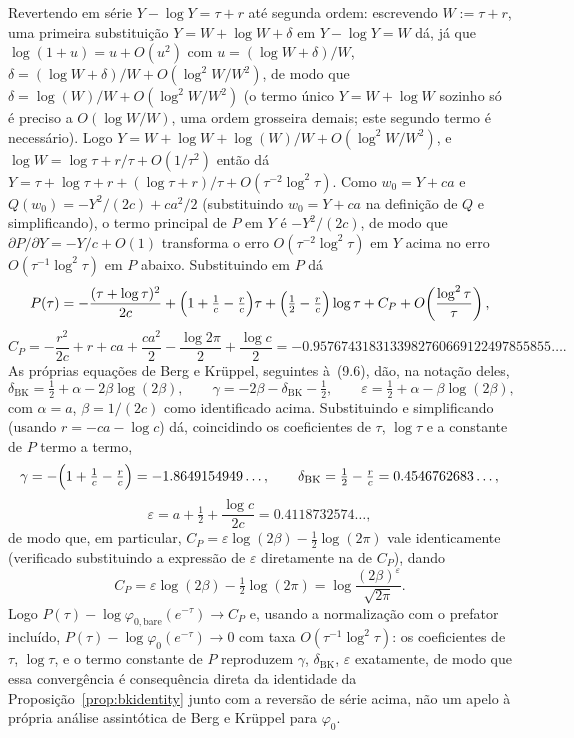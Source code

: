 \documentclass[11pt]{amsart}
\theoremstyle{plain}
\theoremstyle{definition}
\theoremstyle{remark}
\begin{document}
Revertendo em série $Y-\log Y=\tau+r$ até segunda ordem: escrevendo $W:=\tau+r$, uma primeira
substituição $Y=W+\log W+\delta$ em $Y-\log Y=W$ dá, já que $\log(1+u)=u+O(u^2)$ com
$u=(\log W+\delta)/W$, $\delta = (\log W+\delta)/W + O(\log^2W/W^2)$, de modo que
$\delta=\log(W)/W+O(\log^2W/W^2)$ (o termo único $Y=W+\log W$ sozinho só é preciso a
$O(\log W/W)$, uma ordem grosseira demais; este segundo termo é necessário). Logo
$Y=W+\log W+\log(W)/W+O(\log^2W/W^2)$, e $\log W=\log\tau+r/\tau+O(1/\tau^2)$ então dá
$Y = \tau + \log\tau + r + (\log\tau+r)/\tau + O(\tau^{-2}\log^2\tau)$. Como $w_0=Y+ca$ e
$Q(w_0)=-Y^2/(2c)+ca^2/2$ (substituindo $w_0=Y+ca$ na definição de $Q$ e simplificando), o termo
principal de $P$ em $Y$ é $-Y^2/(2c)$, de modo que $\partial P/\partial Y=-Y/c+O(1)$ transforma o
erro $O(\tau^{-2}\log^2\tau)$ em $Y$ acima no erro $O(\tau^{-1}\log^2\tau)$ em $P$ abaixo.
Substituindo em $P$ dá
\[
P(\tau) = -\frac{(\tau+\log\tau)^2}{2c} + \Bigl(1+\tfrac1c-\tfrac{r}{c}\Bigr)\tau +
\Bigl(\tfrac12-\tfrac{r}{c}\Bigr)\log\tau + C_P + O\!\left(\frac{\log^2\tau}{\tau}\right),
\]
\[
C_P = -\frac{r^2}{2c}+r+ca+\frac{ca^2}{2}-\frac{\log2\pi}{2}+\frac{\log c}{2} =
-0.9576743183133982760669122497855855\ldots.
\]
As próprias equações de Berg e Kr\"uppel, seguintes à~(9.6), dão, na notação deles,
\[
\delta_{\mathrm{BK}} = \tfrac12+\alpha-2\beta\log(2\beta), \qquad
\gamma = -2\beta-\delta_{\mathrm{BK}}-\tfrac12, \qquad
\varepsilon = \tfrac12+\alpha-\beta\log(2\beta),
\]
com $\alpha=a$, $\beta=1/(2c)$ como identificado acima. Substituindo e simplificando (usando
$r=-ca-\log c$) dá, coincidindo os coeficientes de $\tau$, $\log\tau$ e a constante de $P$ termo a
termo,
\[
\gamma = -\Bigl(1+\tfrac1c-\tfrac rc\Bigr) = -1.8649154949\ldots, \qquad
\delta_{\mathrm{BK}} = \tfrac12-\tfrac rc = 0.4546762683\ldots,
\]
\[
\varepsilon = a+\tfrac12+\frac{\log c}{2c} = 0.4118732574\ldots,
\]
de modo que, em particular, $C_P=\varepsilon\log(2\beta)-\tfrac12\log(2\pi)$ vale identicamente
(verificado substituindo a expressão de $\varepsilon$ diretamente na de $C_P$), dando
\[
C_P = \varepsilon\log(2\beta) - \tfrac12\log(2\pi) = \log\frac{(2\beta)^\varepsilon}{\sqrt{2\pi}}.
\]
Logo $P(\tau) - \log\varphi_{0,\mathrm{bare}}(e^{-\tau}) \to C_P$ e, usando a normalização com o
prefator incluído, $P(\tau) - \log\varphi_0(e^{-\tau}) \to 0$ com taxa $O(\tau^{-1}\log^2\tau)$: os
coeficientes de $\tau$, $\log\tau$, e o termo constante de $P$ reproduzem $\gamma$,
$\delta_{\mathrm{BK}}$, $\varepsilon$ exatamente, de modo que essa convergência é consequência
direta da identidade da Proposição~\ref{prop:bkidentity} junto com a reversão de série acima, não um
apelo à própria análise assintótica de Berg e Kr\"uppel para $\varphi_0$.
\end{document}
